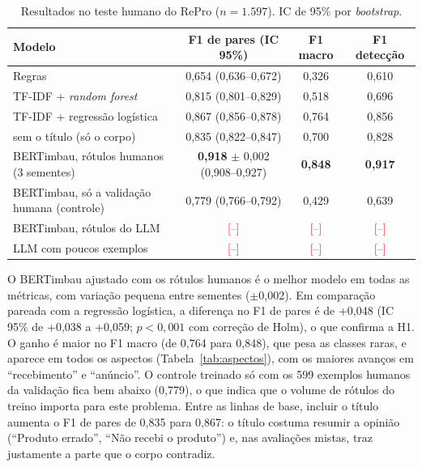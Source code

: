 \documentclass[12pt,a4paper]{article}
\newcommand{\pendente}[1]{\textcolor{red}{[#1]}}
\begin{document}
\begin{table}[ht]
\centering
\caption{Resultados no teste humano do RePro ($n = 1.597$). IC de 95\% por \emph{bootstrap}.}
\label{tab:resultados}
\begin{tabular}{lccc}
\toprule
Modelo & F1 de pares (IC 95\%) & F1 macro & F1 detecção \\
\midrule
Regras                         & 0,654 (0,636--0,672) & 0,326 & 0,610 \\
TF-IDF + \emph{random forest}  & 0,815 (0,801--0,829) & 0,518 & 0,696 \\
TF-IDF + regressão logística   & 0,867 (0,856--0,878) & 0,764 & 0,856 \\
\quad sem o título (só o corpo) & 0,835 (0,822--0,847) & 0,700 & 0,828 \\
\midrule
BERTimbau, rótulos humanos (3 sementes) & \textbf{0,918} $\pm$ 0,002 (0,908--0,927) & \textbf{0,848} & \textbf{0,917} \\
BERTimbau, só a validação humana (controle) & 0,779 (0,766--0,792) & 0,429 & 0,639 \\
BERTimbau, rótulos do LLM               & \pendente{--} & \pendente{--} & \pendente{--} \\
LLM com poucos exemplos                 & \pendente{--} & \pendente{--} & \pendente{--} \\
\bottomrule
\end{tabular}
\end{table}

O BERTimbau ajustado com os rótulos humanos é o melhor modelo em todas as métricas, com variação pequena entre sementes ($\pm$0,002). Em comparação pareada com a regressão logística, a diferença no F1 de pares é de +0,048 (IC 95\% de +0,038 a +0,059; $p < 0{,}001$ com correção de Holm), o que confirma a H1. O ganho é maior no F1 macro (de 0,764 para 0,848), que pesa as classes raras, e aparece em todos os aspectos (Tabela~\ref{tab:aspectos}), com os maiores avanços em ``recebimento'' e ``anúncio''. O controle treinado só com os 599 exemplos humanos da validação fica bem abaixo (0,779), o que indica que o volume de rótulos do treino importa para este problema. Entre as linhas de base, incluir o título aumenta o F1 de pares de 0,835 para 0,867: o título costuma resumir a opinião (``Produto errado'', ``Não recebi o produto'') e, nas avaliações mistas, traz justamente a parte que o corpo contradiz.
\end{document}
